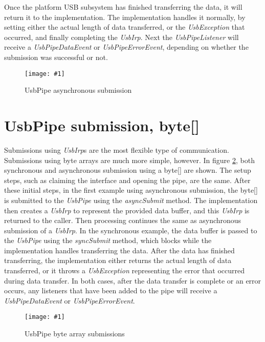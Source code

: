 \documentclass{article}
\newcommand{\myclass}[1]{\emph{#1}}
\newcommand{\myinterface}[1]{\emph{#1}}
\newcommand{\mymethod}[1]{\emph{#1}}
\newcommand{\mysectionend}[0]{\vfill\pagebreak[1]}
\newcommand{\myfigure}[3]{\begin{figure}[htbp]\centering\texttt{[image: \#1]}\caption{#2}\label{#3}\end{figure}}
\begin{document}
Once the platform USB subsystem has finished transferring the data, it will return
it to the implementation.  The implementation handles it normally, by setting
either the actual length of data transferred, or the \myclass{UsbException} that occurred,
and finally completing the \myinterface{UsbIrp}.  Next the \myinterface{UsbPipeListener} will receive a
\myclass{UsbPipeDataEvent} or \myclass{UsbPipeErrorEvent}, depending on whether the submission was
successful or not.

\myfigure{figs/UsbPipeAsync}{UsbPipe asynchronous submission}{UsbPipeAsync}

\mysectionend

%

\section{UsbPipe submission, byte[]}

Submissions using \myinterface{UsbIrp}s are the most flexible type of communication.
Submissions using byte arrays are much more simple, however.  In
figure \ref{UsbPipeByteArray}, both synchronous and asynchronous submission
using a byte[] are shown.  The setup steps, such as claiming the interface
and opening the pipe, are the same.  After these initial steps, in the
first example using asynchronous submission, the byte[] is submitted to
the \myinterface{UsbPipe} using the \mymethod{asyncSubmit} method.  The implementation then
creates a \myinterface{UsbIrp} to represent the provided data buffer, and this \myinterface{UsbIrp} is
returned to the caller.  Then processing continues the same as asynchronous
submission of a \myinterface{UsbIrp}.  In the synchronous example, the data buffer is passed
to the \myinterface{UsbPipe} using the \mymethod{syncSubmit} method, which blocks while the
implementation handles transferring the data.  After the data has finished
transferring, the implementation either returns the actual length of data
transferred, or it throws a \myclass{UsbException} representing the error that
occurred during data transfer.  In both cases, after the data transfer is complete
or an error occurs, any listeners that have been added to the pipe will receive
a \myclass{UsbPipeDataEvent} or \myclass{UsbPipeErrorEvent}.

\myfigure{figs/UsbPipeByteArray}{UsbPipe byte array submissions}{UsbPipeByteArray}

\mysectionend
\end{document}
